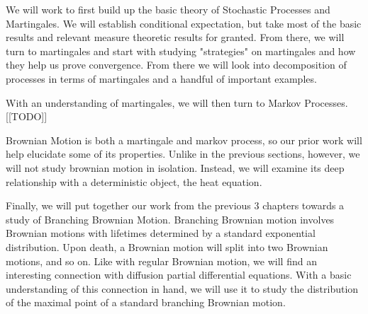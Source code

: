 \summary

We will work to first build up the basic theory of Stochastic Processes and Martingales. We will establish conditional expectation, but take most of the basic results and relevant measure theoretic results for granted. From there, we will turn to martingales and start with studying "strategies" on martingales and how they help us prove convergence. From there we will look into decomposition of processes in terms of martingales and a handful of important examples.

With an understanding of martingales, we will then turn to Markov Processes. [[TODO]]

Brownian Motion is both a martingale and markov process, so our prior work will help elucidate some of its properties. Unlike in the previous sections, however, we will not study brownian motion in isolation. Instead, we will examine its deep relationship with a deterministic object, the heat equation.

Finally, we will put together our work from the previous 3 chapters towards a study of Branching Brownian Motion. Branching Brownian motion involves Brownian motions with lifetimes determined by a standard exponential distribution. Upon death, a Brownian motion will split into two Brownian motions, and so on. Like with regular Brownian motion, we will find an interesting connection with diffusion partial differential equations. With a basic understanding of this connection in hand, we will use it to study the distribution of the maximal point of a standard branching Brownian motion.